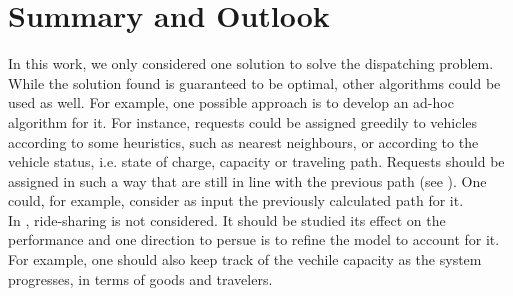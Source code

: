 \chapter{Summary and Outlook}

In this work, we only considered one solution to solve the dispatching problem. While the solution found is guaranteed to be optimal, other algorithms could be used as well. For example, one possible approach is to develop an ad-hoc algorithm for it. For instance, requests could be assigned greedily to vehicles according to some heuristics, such as nearest neighbours, or according to the vehicle status, i.e. state of charge, capacity or traveling path. Requests should be assigned in such a way that are still in line with the previous path (see ). One could, for example, consider as input the previously calculated path for it. \\

In , ride-sharing is not considered. It should be studied its effect on the performance and one direction to persue is to refine the model to account for it. For example, one should also keep track of the vechile capacity as the system progresses, in terms of goods and travelers. 